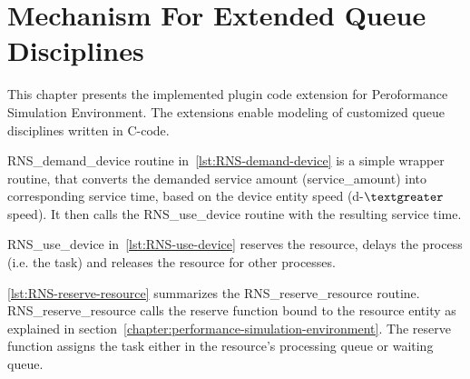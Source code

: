 \chapter{Mechanism For Extended Queue Disciplines}
\label{chapter:mechanism-for-extended-queue-disciplines}


This chapter presents the implemented plugin code extension for Peroformance Simulation Environment. The extensions enable modeling of customized queue disciplines written in C-code.




RNS\_demand\_device routine in~\ref{lst:RNS-demand-device} is a simple wrapper routine, that converts the demanded service amount (service\_amount) into corresponding service time, based on the device entity speed (d-$\textgreater$speed). It then calls the RNS\_use\_device routine with the resulting service time.



RNS\_use\_device in~\ref{lst:RNS-use-device} reserves the resource, delays the process (i.e. the task) and releases the resource for other processes.



\ref{lst:RNS-reserve-resource} summarizes the RNS\_reserve\_resource routine. RNS\_reserve\_resource calls the reserve function bound to the resource entity as explained in section~\ref{chapter:performance-simulation-environment}. The reserve function assigns the task either in the resource's processing queue or waiting queue.

